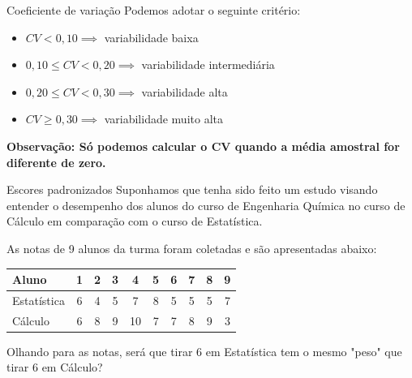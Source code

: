 \begin{frame}{Coeficiente de variação}
    Podemos adotar o seguinte critério:
    \begin{itemize}
        \item $CV < 0,10 \implies$ variabilidade baixa 
        \item $0,10 \leq CV < 0,20 \implies$ variabilidade intermediária
        \item $0,20 \leq CV < 0,30 \implies$ variabilidade alta
        \item $CV \geq 0,30 \implies$ variabilidade muito alta
    \end{itemize}

    \textbf{Observação: Só podemos calcular o CV quando a média amostral for diferente de zero.}
\end{frame}

\begin{frame}{Escores padronizados}
    Suponhamos que tenha sido feito um estudo visando entender o desempenho dos alunos do curso de Engenharia Química no curso de Cálculo em comparação com o curso de Estatística. 
    \pause
    \vspace{5px}
    
    As notas de 9 alunos da turma foram coletadas e são apresentadas abaixo:

    \centering
    \begin{tabular}{lccccccccc}
    \toprule
    Aluno & 1 & 2 & 3 & 4 & 5 & 6 & 7 & 8 & 9 \\
    \midrule
    Estatística & 6 & 4 & 5 & 7 & 8 & 5 & 5 & 5 & 7 \\
    Cálculo     & 6 & 8 & 9 & 10 & 7 & 7 & 8 & 9 & 3 \\
    \bottomrule
    \end{tabular}

    Olhando para as notas, será que tirar 6 em Estatística tem o mesmo "peso" que tirar 6 em Cálculo?
\end{frame}

